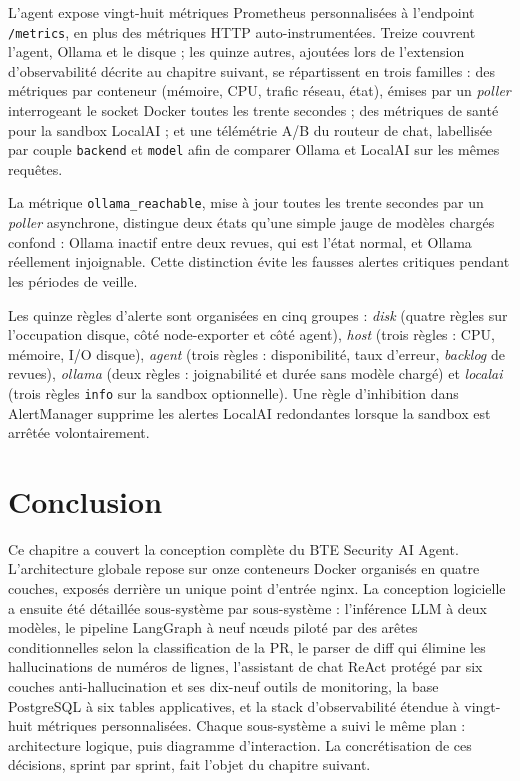         L'agent expose vingt-huit métriques Prometheus personnalisées à l'endpoint
        \texttt{/metrics}, en plus des métriques HTTP auto-instrumentées. Treize couvrent
        l'agent, Ollama et le disque ; les quinze autres, ajoutées lors de l'extension
        d'observabilité décrite au chapitre suivant, se répartissent en trois familles :
        des métriques par conteneur (mémoire, CPU, trafic réseau, état), émises par un
        \textit{poller} interrogeant le socket Docker toutes les trente secondes ; des
        métriques de santé pour la sandbox LocalAI ; et une télémétrie A/B du routeur de
        chat, labellisée par couple \texttt{backend} et \texttt{model} afin de comparer
        Ollama et LocalAI sur les mêmes requêtes.

        La métrique \texttt{ollama\_\allowbreak{}reachable}, mise à jour toutes les trente secondes par
        un \textit{poller} asynchrone, distingue deux états qu'une simple jauge de modèles
        chargés confond : Ollama inactif entre deux revues, qui est l'état normal, et Ollama
        réellement injoignable. Cette distinction évite les fausses alertes critiques pendant
        les périodes de veille.

        Les quinze règles d'alerte sont organisées en cinq groupes : \textit{disk} (quatre
        règles sur l'occupation disque, côté node-exporter et côté agent), \textit{host}
        (trois règles : CPU, mémoire, I/O disque), \textit{agent} (trois règles :
        disponibilité, taux d'erreur, \textit{backlog} de revues), \textit{ollama} (deux
        règles : joignabilité et durée sans modèle chargé) et \textit{localai} (trois règles
        \texttt{info} sur la sandbox optionnelle). Une règle d'inhibition dans AlertManager
        supprime les alertes LocalAI redondantes lorsque la sandbox est arrêtée volontairement.

\section*{Conclusion}

Ce chapitre a couvert la conception complète du BTE Security AI Agent. L'architecture
globale repose sur onze conteneurs Docker organisés en quatre couches, exposés derrière
un unique point d'entrée nginx. La conception logicielle a ensuite été détaillée
sous-système par sous-système : l'inférence LLM à deux modèles, le pipeline LangGraph
à neuf nœuds piloté par des arêtes conditionnelles selon la classification de la PR,
le parser de diff qui élimine les hallucinations de numéros de lignes, l'assistant de
chat ReAct protégé par six couches anti-hallucination et ses dix-neuf outils de
monitoring, la base PostgreSQL à six tables applicatives, et la stack d'observabilité
étendue à vingt-huit métriques personnalisées. Chaque sous-système a suivi le même
plan : architecture logique, puis diagramme d'interaction. La concrétisation de ces
décisions, sprint par sprint, fait l'objet du chapitre suivant.
